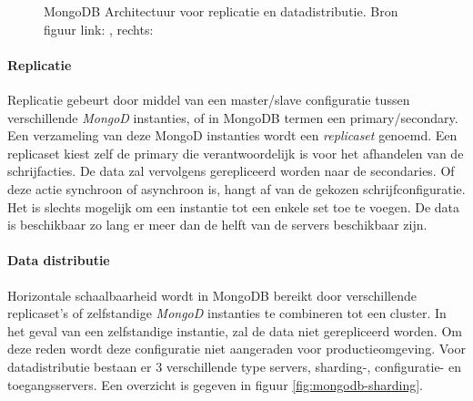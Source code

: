 \begin{figure}[ht!] 
\centering
	\hfill
	\caption{MongoDB Architectuur voor replicatie en datadistributie. Bron figuur link: \cite{mongodb-replicaset}, rechts: \cite{mongodb-shard}}
	\label{fig:mongodb-architectuur}
\end{figure}

\paragraph{Replicatie\cite{mongodb-replicaset}} Replicatie gebeurt door middel van een master/slave configuratie tussen verschillende \textit{MongoD} instanties, of in MongoDB termen een primary/secondary. Een verzameling van deze MongoD instanties wordt een \textit{replicaset} genoemd. Een replicaset kiest zelf de primary die verantwoordelijk is voor het afhandelen van de schrijfacties. De data zal vervolgens gerepliceerd worden naar de secondaries. Of deze actie synchroon of asynchroon is, hangt af van de gekozen schrijfconfiguratie.  Het is slechts mogelijk om een instantie tot een enkele set toe te voegen. De data is beschikbaar zo lang er meer dan de helft van de servers beschikbaar zijn. 

\paragraph{Data distributie\cite{mongodb-shard}} Horizontale schaalbaarheid wordt in MongoDB bereikt door verschillende replicaset's of zelfstandige \textit{MongoD} instanties te combineren tot een cluster. In het geval van een zelfstandige instantie, zal de data niet gerepliceerd worden. Om deze reden wordt deze configuratie niet aangeraden voor productieomgeving. Voor datadistributie bestaan er 3 verschillende type servers, sharding-, configuratie- en toegangsservers. Een overzicht is gegeven in figuur \ref{fig:mongodb-sharding}. 

